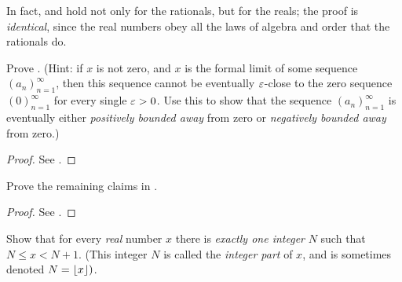 \begin{proposition} \label{prop 5.4.16}
In fact,  and  hold not only for the rationals, but for the reals;
the proof is \emph{identical}, since the real numbers obey all the laws of algebra and order that the rationals do.
\end{proposition}

\exercisesection

\begin{exercise} \label{exercise 5.4.1}
Prove .
(Hint: if \(x\) is not zero, and \(x\) is the formal limit of some sequence \((a_n)_{n = 1}^{\infty}\), then this sequence cannot be eventually \(\varepsilon\)-close to the zero sequence \((0)_{n = 1}^{\infty}\) for every single \(\varepsilon > 0\).
Use this to show that the sequence \((a_n)_{n = 1}^{\infty}\) is eventually either \emph{positively bounded away} from zero or \emph{negatively bounded away} from zero.)
\end{exercise}

\begin{proof}
See .
\end{proof}

\begin{exercise} \label{exercise 5.4.2}
Prove the remaining claims in .
\end{exercise}

\begin{proof}
See .
\end{proof}

\begin{exercise} \label{exercise 5.4.3}
Show that for every \emph{real} number \(x\) there is \emph{exactly one integer} \(N\) such that \(N \le x < N + 1\).
(This integer \(N\) is called the \emph{integer part} of \(x\), and is sometimes denoted \(N = \lfloor{x}\rfloor)\).
\end{exercise}

